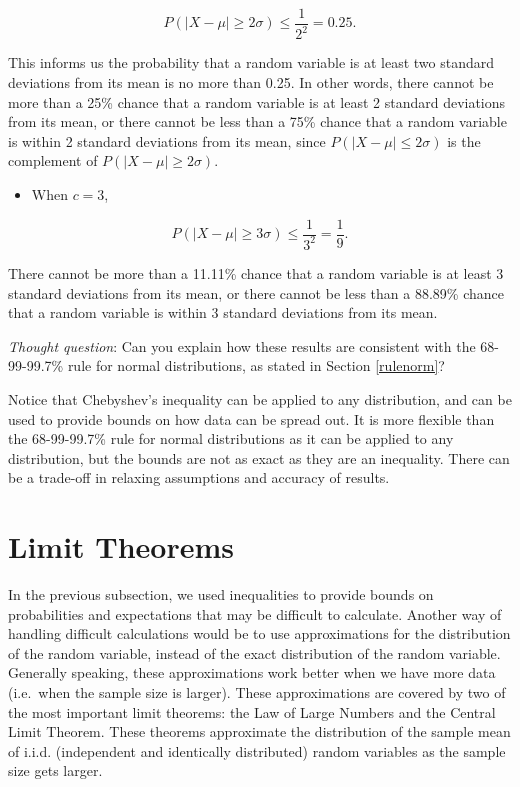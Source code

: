 \documentclass[
]{book}
\providecommand{\tightlist}{%
  \setlength{\itemsep}{0pt}\setlength{\parskip}{0pt}}
\begin{document}
\[
P(|X-\mu| \geq 2\sigma) \leq \frac{1}{2^2} = 0.25.
\]

This informs us the probability that a random variable is at least two standard deviations from its mean is no more than 0.25. In other words, there cannot be more than a 25\% chance that a random variable is at least 2 standard deviations from its mean, or there cannot be less than a 75\% chance that a random variable is within 2 standard deviations from its mean, since \(P(|X-\mu| \leq 2\sigma)\) is the complement of \(P(|X-\mu| \geq 2\sigma)\).

\begin{itemize}
\tightlist
\item
  When \(c=3\),
\end{itemize}

\[
P(|X-\mu| \geq 3\sigma) \leq \frac{1}{3^2} = \frac{1}{9}.
\]

There cannot be more than a 11.11\% chance that a random variable is at least 3 standard deviations from its mean, or there cannot be less than a 88.89\% chance that a random variable is within 3 standard deviations from its mean.

\emph{Thought question}: Can you explain how these results are consistent with the 68-99-99.7\% rule for normal distributions, as stated in Section \ref{rulenorm}?

Notice that Chebyshev's inequality can be applied to any distribution, and can be used to provide bounds on how data can be spread out. It is more flexible than the 68-99-99.7\% rule for normal distributions as it can be applied to any distribution, but the bounds are not as exact as they are an inequality. There can be a trade-off in relaxing assumptions and accuracy of results.

\hypertarget{limits}{%
\section{Limit Theorems}\label{limits}}

In the previous subsection, we used inequalities to provide bounds on probabilities and expectations that may be difficult to calculate. Another way of handling difficult calculations would be to use approximations for the distribution of the random variable, instead of the exact distribution of the random variable. Generally speaking, these approximations work better when we have more data (i.e.~when the sample size is larger). These approximations are covered by two of the most important limit theorems: the Law of Large Numbers and the Central Limit Theorem. These theorems approximate the distribution of the sample mean of i.i.d. (independent and identically distributed) random variables as the sample size gets larger.
\end{document}
